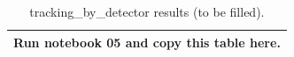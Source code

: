 \begin{table}[h]\centering\caption{tracking\_by\_detector results (to be filled).}\small\begin{tabular}{l}\toprule Run notebook 05 and copy this table here.\\\bottomrule\end{tabular}\end{table}
